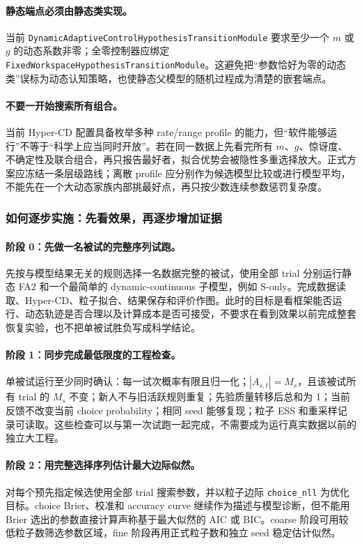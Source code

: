 \paragraph{静态端点必须由静态类实现。}
当前 \texttt{DynamicAdaptiveControlHypothesisTransitionModule} 要求至少一个
$m$ 或 $g$ 的动态系数非零；全零控制器应绑定
\texttt{FixedWorkspaceHypothesisTransitionModule}。这避免把“参数恰好为零的动态类”误标为动态认知策略，也使静态父模型的随机过程成为清楚的嵌套端点。

\paragraph{不要一开始搜索所有组合。}
当前 Hyper-CD 配置具备枚举多种 rate/range profile 的能力，但“软件能够运行”不等于“科学上应当同时开放”。若在同一数据上先看完所有 $m$、$g$、惊讶度、不确定性及联合组合，再只报告最好者，拟合优势会被隐性多重选择放大。正式方案应冻结一条层级路线；离散 profile 应分别作为候选模型比较或进行模型平均，不能先在一个大动态家族内部挑最好点，再只按少数连续参数惩罚复杂度。


\subsubsection{如何逐步实施：先看效果，再逐步增加证据}

\paragraph{阶段 0：先做一名被试的完整序列试跑。}
先按与模型结果无关的规则选择一名数据完整的被试，使用全部 trial 分别运行静态 FA2 和一个最简单的 dynamic-continuous 子模型，例如 S-only。完成数据读取、Hyper-CD、粒子拟合、结果保存和评价作图。此时的目标是看框架能否运行、动态轨迹是否合理以及计算成本是否可接受，不要求在看到效果以前完成整套恢复实验，也不把单被试胜负写成科学结论。

\paragraph{阶段 1：同步完成最低限度的工程检查。}
单被试运行至少同时确认：每一试次概率有限且归一化；$|A_{s,t}|=M_s$，且该被试所有 trial 的 $M_s$ 不变；新人不与旧活跃规则重复；先验质量转移后总和为 1；当前反馈不改变当前 choice probability；相同 seed 能够复现；粒子 ESS 和重采样记录可读取。这些检查可以与第一次试跑一起完成，不需要成为运行真实数据以前的独立大工程。

\paragraph{阶段 2：用完整选择序列估计最大边际似然。}
对每个预先指定候选使用全部 trial 搜索参数，并以粒子边际 \texttt{choice\_nll} 为优化目标。choice Brier、校准和 accuracy curve 继续作为描述与模型诊断，但不能用 Brier 选出的参数直接计算声称基于最大似然的 AIC 或 BIC。coarse 阶段可用较低粒子数筛选参数区域，fine 阶段再用正式粒子数和独立 seed 稳定估计似然。

